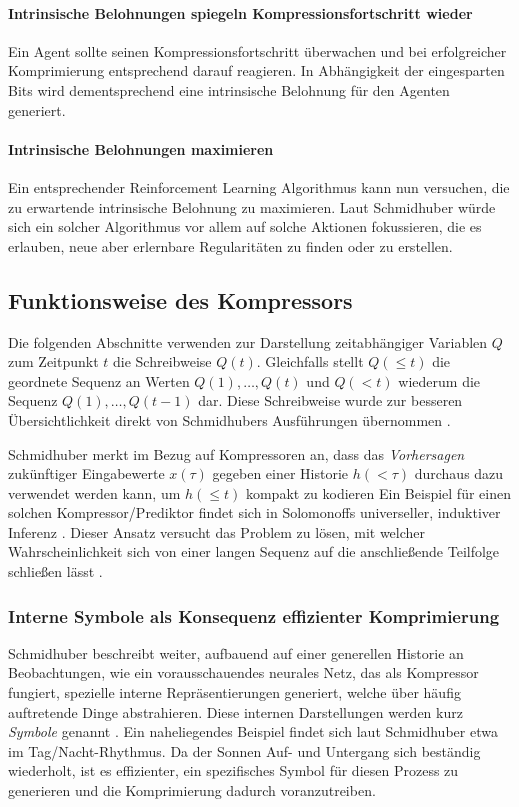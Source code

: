 \paragraph{Intrinsische Belohnungen spiegeln Kompressionsfortschritt wieder}
Ein Agent sollte seinen Kompressionsfortschritt überwachen und bei erfolgreicher Komprimierung entsprechend darauf reagieren. In Abhängigkeit der eingesparten Bits wird dementsprechend eine intrinsische Belohnung für den Agenten generiert.

\paragraph{Intrinsische Belohnungen maximieren}
Ein entsprechender Reinforcement Learning Algorithmus kann nun versuchen, die zu erwartende intrinsische Belohnung zu maximieren. Laut Schmidhuber würde sich ein solcher Algorithmus vor allem auf solche Aktionen fokussieren, die es erlauben, neue aber erlernbare Regularitäten zu finden oder zu erstellen.


\subsection{Funktionsweise des Kompressors}
\label{sec:Kompressor}
Die folgenden Abschnitte verwenden zur Darstellung zeitabhängiger Variablen \(Q\) zum Zeitpunkt \(t\) die Schreibweise \(Q(t)\). Gleichfalls stellt \(Q(\leq t)\) die geordnete Sequenz an Werten \(Q(1), \dots,Q(t)\) und \(Q(<t)\) wiederum die Sequenz \(Q(1), \dots, Q(t-1)\) dar. Diese Schreibweise wurde zur besseren Übersichtlichkeit direkt von Schmidhubers Ausführungen übernommen \cite{curiosity_schmidhuber}.

Schmidhuber merkt im Bezug auf Kompressoren an, dass das \emph{Vorhersagen} zukünftiger Eingabewerte \(x(\tau)\) gegeben einer Historie \(h(<\tau)\) durchaus dazu verwendet werden kann, um \(h(\leq t)\) kompakt zu kodieren \cite[p.~18]{curiosity_schmidhuber}
Ein Beispiel für einen solchen Kompressor/Prediktor findet sich in Solomonoffs universeller, induktiver Inferenz \cite[p.~18]{curiosity_schmidhuber}. 
Dieser Ansatz versucht das Problem zu lösen, mit welcher Wahrscheinlichkeit sich von einer langen Sequenz auf die anschließende Teilfolge schließen lässt \cite{SOLOMONOFF19641}.

\subsubsection{Interne Symbole als Konsequenz effizienter Komprimierung}
Schmidhuber beschreibt weiter, aufbauend auf einer generellen Historie an Beobachtungen, wie ein vorausschauendes neurales Netz, das als Kompressor fungiert, spezielle interne Repräsentierungen generiert, welche über häufig auftretende Dinge abstrahieren. Diese internen Darstellungen werden kurz \emph{Symbole} genannt \cite[p.~6]{curiosity_schmidhuber}. Ein naheliegendes Beispiel findet sich laut Schmidhuber etwa im Tag/Nacht-Rhythmus. Da der Sonnen Auf- und Untergang sich beständig wiederholt, ist es effizienter, ein spezifisches Symbol für diesen Prozess zu generieren und die Komprimierung dadurch voranzutreiben.


